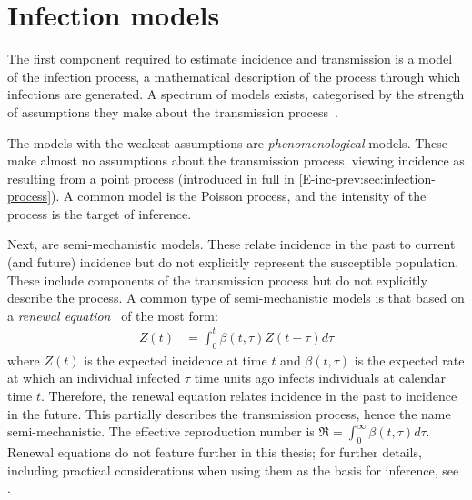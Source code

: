 \documentclass[thesis.tex]{subfiles}
\begin{document}
\section{Infection models}

The first component required to estimate incidence and transmission is a model of the infection process, a mathematical description of the process through which infections are generated.
A spectrum of models exists, categorised by the strength of assumptions they make about the transmission process~\autocite{beckerCOVIDmodels}.

The models with the weakest assumptions are \emph{phenomenological} models.
These make almost no assumptions about the transmission process, viewing incidence as resulting from a point process (introduced in full in \cref{E-inc-prev:sec:infection-process}).
A common model is the Poisson process, and the intensity of the process is the target of inference.

Next, are semi-mechanistic models.
These relate incidence in the past to current (and future) incidence but do not explicitly represent the susceptible population.
These include components of the transmission process  but do not explicitly describe the process.
A common type of semi-mechanistic models is that based on a \emph{renewal equation}~\autocite{bhattSemimechanistic,fraserRenewal} of the most form:
\begin{align}
    Z(t) &= \int_{0}^{t} \beta(t,\tau) Z(t-\tau) d \tau
    \label{intro:eq:renewal}
\end{align}
where $Z(t)$ is the expected incidence at time $t$ and $\beta(t, \tau)$ is the expected rate at which an individual infected $\tau$ time units ago infects individuals at calendar time $t$.
Therefore, the renewal equation relates incidence in the past to incidence in the future.
This partially describes the transmission process, hence the name semi-mechanistic.
The effective reproduction number is $\Re = \int_0^\infty \beta(t, \tau) d\tau$.
Renewal equations do not feature further in this thesis; for further details, including practical considerations when using them as the basis for inference, see \textcite{nashEstimating,gosticPractical}.
\end{document}
